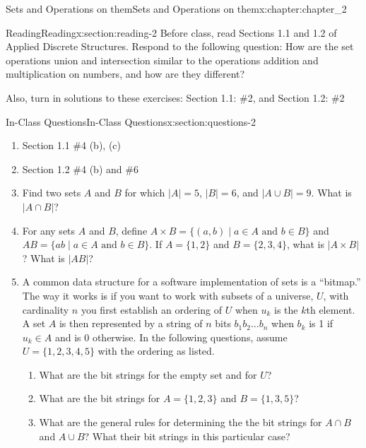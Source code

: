 \documentclass[oneside,10pt,]{book}
\numberwithin{equation}{section}
\begin{document}
\typeout{************************************************}
%
\begin{chapterptx}{Sets and Operations on them}{}{Sets and Operations on them}{}{}{x:chapter:chapter_2}
%
%
%
\typeout{************************************************}
\typeout{************************************************}
%
\begin{sectionptx}{Reading}{}{Reading}{}{}{x:section:reading-2}
Before class, read Sections 1.1 and 1.2 of Applied Discrete Structures.  Respond to the following question: How are the set operations union and intersection similar to the operations addition and multiplication on numbers, and how are they different?%
\par
Also, turn in solutions to these exercises:  Section 1.1: \#2, and Section 1.2: \#2%
\end{sectionptx}
%
%
\typeout{************************************************}
\typeout{************************************************}
%
\begin{sectionptx}{In-Class Questions}{}{In-Class Questions}{}{}{x:section:questions-2}
%
\begin{enumerate}[label=\arabic*.]
\item{}Section 1.1 \#4 (b), (c)%
\item{}Section 1.2 \#4 (b) and \#6%
\item{}Find two sets \(A\) and \(B\) for which \(|A| = 5\), \(|B| = 6\), and \(|A\cup B| = 9\). What is \(|A \cap B|\)?%
\item{}For any sets \(A\) and \(B\), define \(A\times B = \{(a,b) \mid a\in A \text{ and } b \in B\}\) and \(AB = \{ab \mid a\in A \text{ and } b \in B\}\). If \(A = \{1,2\}\) and \(B = \{2,3,4\}\),  what is \(|A \times B|\)? What is \(|AB|\)?%
\item{}A common data structure for a software implementation of sets is a ``bitmap.''  The way it works is if you want to work with subsets of a universe, \(U\), with cardinality \(n\) you first establish an ordering of \(U\) when \(u_k\) is the \(k\)th element.  A set \(A\) is then represented by a string of \(n\) bits  \(b_1b_2\dots b_n\) when \(b_k\) is 1 if \(u_k \in A\) and is 0 otherwise. In the following questions, assume \(U=\{1,2,3,4,5\}\) with the ordering as listed.%
\begin{enumerate}[label=(\alph*)]
\item{}What are the bit strings for the empty set and for \(U\)?%
\item{}What are the bit strings for \(A=\{1,2,3\}\) and \(B=\{1,3,5\}\)?%
\item{}What are the general rules for determining the the bit strings for \(A\cap B\) and \(A \cup B\)?  What their bit strings in this particular case?%
\end{enumerate}
%
\end{enumerate}
%
\end{sectionptx}
\end{chapterptx}
\end{document}
